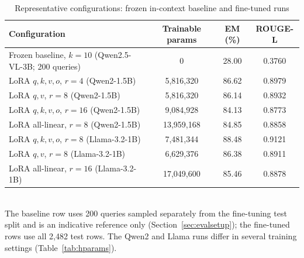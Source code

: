 \begin{table}[htbp]
  \centering
  \caption{Representative configurations: frozen in-context baseline and fine-tuned runs}
  \label{tab:results}
  \small
  \setlength{\tabcolsep}{4pt}
  \begin{tabular}{P{2.3in}ccc}
    \toprule
    \textbf{Configuration} & \textbf{Trainable params} & \textbf{EM (\%)} & \textbf{ROUGE-L} \\
    \midrule
    Frozen baseline, $k{=}10$ (Qwen2.5-VL-3B; 200 queries) & 0 & 28.00 & 0.3760 \\
    \midrule
    LoRA $q,k,v,o$, $r{=}4$ (Qwen2-1.5B) & 5,816,320 & 86.62 & 0.8979 \\
    LoRA $q,v$, $r{=}8$ (Qwen2-1.5B) & 5,816,320 & 86.14 & 0.8932 \\
    LoRA $q,k,v,o$, $r{=}16$ (Qwen2-1.5B) & 9,084,928 & 84.13 & 0.8773 \\
    LoRA all-linear, $r{=}8$ (Qwen2-1.5B) & 13,959,168 & 84.85 & 0.8858 \\
    LoRA $q,k,v,o$, $r{=}8$ (Llama-3.2-1B) & 7,481,344 & 88.48 & 0.9121 \\
    LoRA $q,v$, $r{=}8$ (Llama-3.2-1B) & 6,629,376 & 86.38 & 0.8911 \\
    LoRA all-linear, $r{=}16$ (Llama-3.2-1B) & 17,049,600 & 85.46 & 0.8878 \\  %
    \bottomrule
  \end{tabular}\\[2pt]
  {\footnotesize The baseline row uses 200 queries sampled separately from the fine-tuning test split and is an indicative reference only (Section~\ref{sec:evalsetup}); the fine-tuned rows use all 2,482 test rows. The Qwen2 and Llama runs differ in several training settings (Table~\ref{tab:hparams}).}
\end{table}
